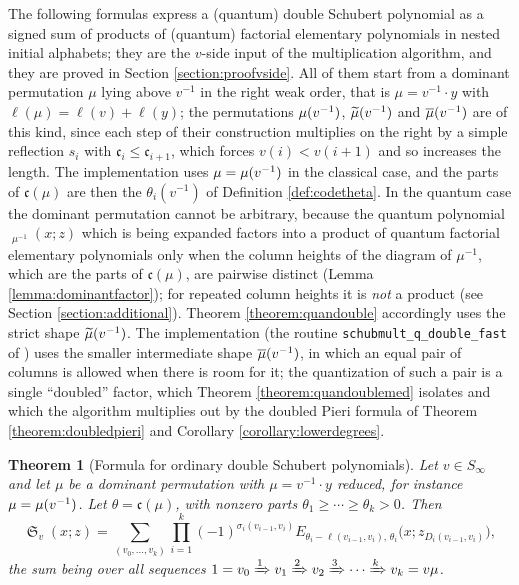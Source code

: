 \documentclass{amsart}
\newtheorem{theorem}[lemma]{Theorem}
\theoremstyle{definition}
\theoremstyle{remark}
\numberwithin{equation}{section}
\DeclareMathOperator{\sch}{\mathfrak{S}}
\DeclareMathOperator{\qsch}{\widetilde{\mathfrak{S}}}
\newcommand{\code}{\mathfrak{c}}
\begin{document}
The following formulas express a (quantum) double Schubert polynomial as a signed sum of products of (quantum) factorial elementary polynomials in nested initial alphabets; they are the $v$-side input of the multiplication algorithm, and they are proved in Section \ref{section:proofvside}. All of them start from a dominant permutation $\mu$ lying above $v^{-1}$ in the right weak order, that is $\mu=v^{-1}\cdot y$ with $\ell(\mu)=\ell(v)+\ell(y)$; the permutations $\mu(v^{-1})$, $\widetilde{\mu}(v^{-1})$ and $\overline{\mu}(v^{-1})$ are of this kind, since each step of their construction multiplies on the right by a simple reflection $s_i$ with $\code_i\leq\code_{i+1}$, which forces $v(i)<v(i+1)$ and so increases the length. The implementation uses $\mu=\mu(v^{-1})$ in the classical case, and the parts of $\code(\mu)$ are then the $\theta_i(v^{-1})$ of Definition \ref{def:codetheta}. In the quantum case the dominant permutation cannot be arbitrary, because the quantum polynomial $\qsch_{\mu^{-1}}(x;z)$ which is being expanded factors into a product of quantum factorial elementary polynomials only when the column heights of the diagram of $\mu^{-1}$, which are the parts of $\code(\mu)$, are pairwise distinct (Lemma \ref{lemma:dominantfactor}); for repeated column heights it is \emph{not} a product (see Section \ref{section:additional}). Theorem \ref{theorem:quandouble} accordingly uses the strict shape $\widetilde{\mu}(v^{-1})$. The implementation (the routine \texttt{schubmult\_q\_double\_fast} of \cite{schubmult}) uses the smaller intermediate shape $\overline{\mu}(v^{-1})$, in which an equal pair of columns is allowed when there is room for it; the quantization of such a pair is a single ``doubled'' factor, which Theorem \ref{theorem:quandoublemed} isolates and which the algorithm multiplies out by the doubled Pieri formula of Theorem \ref{theorem:doubledpieri} and Corollary \ref{corollary:lowerdegrees}.

\begin{theorem}[Formula for ordinary double Schubert polynomials] \label{theorem:orddouble}
Let $v\in S_\infty$ and let $\mu$ be a dominant permutation with $\mu=v^{-1}\cdot y$ reduced, for instance $\mu=\mu(v^{-1})$. Let $\theta=\code(\mu)$, with nonzero parts $\theta_1\geq\cdots\geq\theta_k>0$. Then
$$\sch_v(x;z)=\sum_{(v_0,\ldots,v_k)}\prod_{i=1}^k (-1)^{\sigma_i(v_{i-1},v_i)}E_{\theta_i-\ell(v_{i-1},v_i),\,\theta_i}\big(x;z_{D_i(v_{i-1},v_i)}\big),$$
the sum being over all sequences $1=v_0\xRightarrow{1}v_1\xRightarrow{2}v_2\xRightarrow{3}\cdots\xRightarrow{k}v_k=v\mu$.
\end{theorem}
\end{document}
